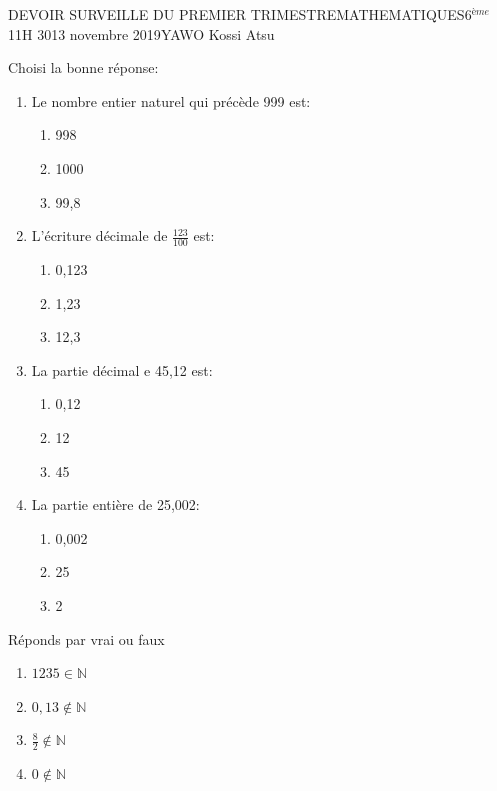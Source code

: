 \documentclass[12pt,a4paper]{book}
\newcommand{\prof}{YAWO Kossi Atsu}
\newcommand{\matiere}{MATHEMATIQUES}
\newcommand{\classe}{6$^{ème}$}
\begin{document}
\begin{devoir}{DEVOIR SURVEILLE DU PREMIER TRIMESTRE}{\matiere}{\classe}{1}{1H 30}{13 novembre 2019}{\prof}
\vspace{0.5cm}
\begin{exo}[4]
\begin{defitemize}
\item Choisi la bonne réponse:
\begin{multicols}{2}
\begin{enumerate}
\item Le nombre entier naturel qui précède 999 est:
\begin{enumerate}
\item 998
\item 1000
\item 99,8
\end{enumerate}
\item L'écriture décimale de $\frac{123}{100}$ est:
\begin{enumerate}
\item 0,123
\item 1,23
\item 12,3
\end{enumerate}
\item La partie décimal e 45,12 est:
\begin{enumerate}
\item 0,12
\item 12
\item 45
\end{enumerate}
\item La partie entière de 25,002:
\begin{enumerate}
\item 0,002
\item 25
\item 2
\end{enumerate}

\end{enumerate}
\end{multicols}

\item Réponds par vrai ou faux
\begin{enumerate}
\item $1235 \in \mathbb{N}$
\item $0,13 \notin \mathbb{N}$ 
\item $\frac{8}{2} \notin \mathbb{N}$
\item $0 \notin \mathbb{N}$
\end{enumerate}
\end{defitemize}
\end{exo}


\end{devoir}
\end{document}
